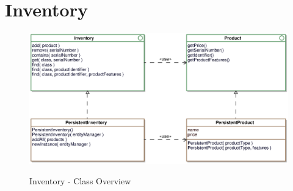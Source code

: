 \newpage
\section{Inventory}

\begin{figure}[ht]
	\centering
  \includegraphics[width=1.0\textwidth]{images/Inventory_Overview.eps}
	\label{inventory_overview}
	\caption{Inventory - Class Overview}
\end{figure}
